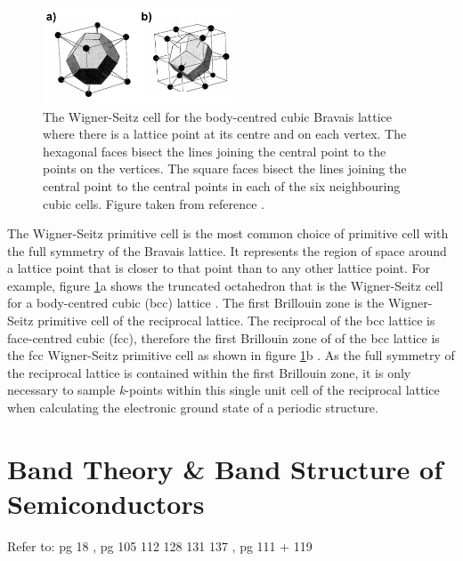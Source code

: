 \begin{figure}[h!]
  \centering
    \includegraphics[width=0.5\textwidth]{figures/Wigner-Seitz.png}
    \caption{The Wigner-Seitz cell for the body-centred cubic Bravais lattice where there is a lattice point at its centre and on each vertex. The hexagonal faces bisect the lines joining the central point to the points on the vertices. The square faces bisect the lines joining the central point to the central points in each of the six neighbouring cubic cells. Figure taken from reference .}
  \label{Wigner-Seitz}
\end{figure}

The Wigner-Seitz primitive cell is the most common choice of primitive cell with the full symmetry of the Bravais lattice. It represents the region of space around a lattice point  that is closer to that point than to any other lattice point. For example, figure \ref{Wigner-Seitz}a shows the truncated octahedron that is the Wigner-Seitz cell for a body-centred cubic (bcc) lattice \cite{AshcroftMermin2}.
The first Brillouin zone is the Wigner-Seitz primitive cell of the reciprocal lattice. The reciprocal of the bcc lattice is face-centred cubic (fcc), therefore the first Brillouin zone of  of the bcc lattice is the fcc Wigner-Seitz primitive cell as shown in figure \ref{Wigner-Seitz}b \cite{AshcroftMermin3}. As the full symmetry of the reciprocal lattice is contained within the first Brillouin zone, it is only necessary to sample \textit{k}-points within this single unit cell of the reciprocal lattice when calculating the electronic ground state of a periodic structure.

 
\section{Band Theory \& Band Structure of Semiconductors}\label{band_theory}
Refer to: pg 18 \cite{fund_semi}, pg 105 112 128 131 137 \cite{thin_film_Boer}, pg 111 + 119 \cite{phys_semicond}\\

